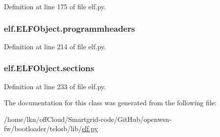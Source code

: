 Definition at line 175 of file elf.\+py.

\subsubsection[{\texorpdfstring{programmheaders}{programmheaders}}]{\setlength{\rightskip}{0pt plus 5cm}elf.\+E\+L\+F\+Object.\+programmheaders}\hypertarget{clasself_1_1_e_l_f_object_aaa4f49d3a9ec29974a7b6109eb765c53}{}\label{clasself_1_1_e_l_f_object_aaa4f49d3a9ec29974a7b6109eb765c53}


Definition at line 214 of file elf.\+py.

\subsubsection[{\texorpdfstring{sections}{sections}}]{\setlength{\rightskip}{0pt plus 5cm}elf.\+E\+L\+F\+Object.\+sections}\hypertarget{clasself_1_1_e_l_f_object_aef845ed33797cb0c16b6ab31b104f062}{}\label{clasself_1_1_e_l_f_object_aef845ed33797cb0c16b6ab31b104f062}


Definition at line 233 of file elf.\+py.



The documentation for this class was generated from the following file\+:\begin{DoxyCompactItemize}
\item 
/home/lkn/off\+Cloud/\+Smartgrid-\/code/\+Git\+Hub/openwsn-\/fw/bootloader/telosb/lib/\hyperlink{elf_8py}{elf.\+py}\end{DoxyCompactItemize}
